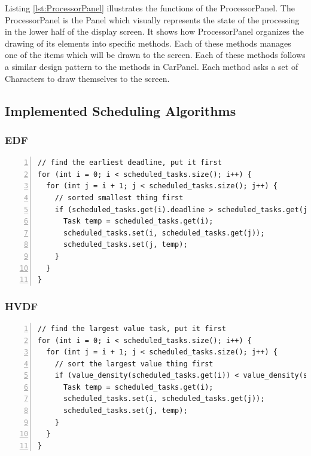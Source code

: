 \documentclass{article} %
\begin{document}
Listing \ref{lst:ProcessorPanel} illustrates the functions of the ProcessorPanel.
The ProcessorPanel is the Panel which visually represents the state of the processing in the lower half of the display screen.
It shows how ProcessorPanel organizes the drawing of its elements into specific methods.
Each of these methods manages one of the items which will be drawn to the screen.
Each of these methods follows a similar design pattern to the methods in CarPanel.
Each method asks a set of Characters to draw themselves to the screen.

\subsection{Implemented Scheduling Algorithms}
\subsubsection{EDF}
\begin{lstlisting}[caption={EDF scheduler implementation},label={lst:ProcessorPanel},numbers=left]
// find the earliest deadline, put it first
for (int i = 0; i < scheduled_tasks.size(); i++) {
  for (int j = i + 1; j < scheduled_tasks.size(); j++) {
    // sorted smallest thing first
    if (scheduled_tasks.get(i).deadline > scheduled_tasks.get(j).deadline) {
      Task temp = scheduled_tasks.get(i);
      scheduled_tasks.set(i, scheduled_tasks.get(j));
      scheduled_tasks.set(j, temp);
    }
  }
}
\end{lstlisting}

\subsubsection{HVDF}
\begin{lstlisting}[caption={HVDF scheduler implementation},label={lst:ProcessorPanel},numbers=left]
// find the largest value task, put it first
for (int i = 0; i < scheduled_tasks.size(); i++) {
  for (int j = i + 1; j < scheduled_tasks.size(); j++) {
    // sort the largest value thing first
    if (value_density(scheduled_tasks.get(i)) < value_density(scheduled_tasks.get(j))) {
      Task temp = scheduled_tasks.get(i);
      scheduled_tasks.set(i, scheduled_tasks.get(j));
      scheduled_tasks.set(j, temp);
    }
  }
}
\end{lstlisting}

\end{document}
